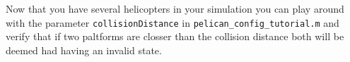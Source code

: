 \documentclass[a4paper,11pt]{article}
\begin{document}
Now that you have several helicopters in your simulation you can play around with the parameter \texttt{collisionDistance} in \texttt{pelican\_config\_tutorial.m} and verify that if two paltforms are closser than the collision distance both will be deemed had having an invalid state.



%
%
\end{document}
